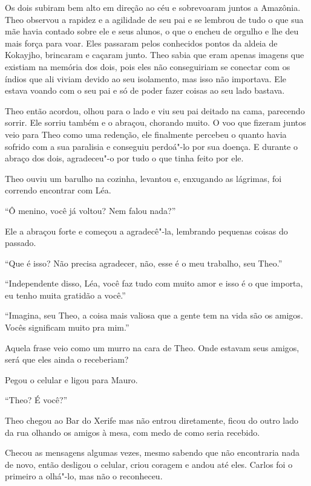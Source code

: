 Os dois subiram bem alto em direção ao céu e sobrevoaram juntos a
Amazônia. Theo observou a rapidez e a agilidade de seu pai e se lembrou
de tudo o que sua mãe havia contado sobre ele e seus alunos, o que o
encheu de orgulho e lhe deu mais força para voar. Eles passaram pelos
conhecidos pontos da aldeia de Kokayjho, brincaram e caçaram junto. Theo
sabia que eram apenas imagens que existiam na memória dos dois, pois
eles não conseguiriam se conectar com os índios que ali viviam devido ao
seu isolamento, mas isso não importava. Ele estava voando com o seu pai
e só de poder fazer coisas ao seu lado bastava.

Theo então acordou, olhou para o lado e viu seu pai deitado na cama,
parecendo sorrir. Ele sorriu também e o abraçou, chorando muito. O voo
que fizeram juntos veio para Theo como uma redenção, ele finalmente
percebeu o quanto havia sofrido com a sua paralisia e conseguiu
perdoá"-lo por sua doença. E durante o abraço dos dois, agradeceu"-o por
tudo o que tinha feito por ele.

Theo ouviu um barulho na cozinha, levantou e, enxugando as lágrimas, foi
correndo encontrar com Léa.

``Ô menino, você já voltou? Nem falou nada?''

Ele a abraçou forte e começou a agradecê"-la, lembrando pequenas coisas
do passado.

``Que é isso? Não precisa agradecer, não, esse é o meu trabalho, seu
Theo.''

``Independente disso, Léa, você faz tudo com muito amor e isso é o que
importa, eu tenho muita gratidão a você.''

``Imagina, seu Theo, a coisa mais valiosa que a gente tem na vida são os
amigos. Vocês significam muito pra mim.''

Aquela frase veio como um murro na cara de Theo. Onde estavam seus
amigos, será que eles ainda o receberiam?

Pegou o celular e ligou para Mauro.

``Theo? É você?''

\asterisc


Theo chegou ao Bar do Xerife mas não entrou diretamente, ficou do outro
lado da rua olhando os amigos à mesa, com medo de como seria recebido.

Checou as mensagens algumas vezes, mesmo sabendo que não encontraria
nada de novo, então desligou o celular, criou coragem e andou até eles.
Carlos foi o primeiro a olhá"-lo, mas não o reconheceu.


